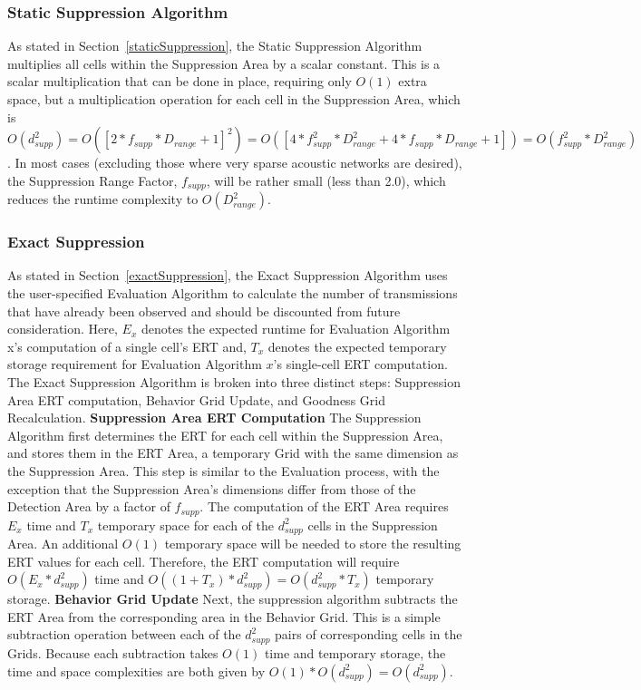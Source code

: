 \subsubsection{Static Suppression Algorithm}
As stated in Section~\ref{staticSuppression}, the Static Suppression Algorithm multiplies all cells within the Suppression Area by a scalar constant.  This is a scalar multiplication that can be done in place, requiring only $O(1)$ extra space, but a multiplication operation for each cell in the Suppression Area, which is $O(d_{supp} ^2) = O([2*f_{supp}*D_{range} + 1]^2) = O([4*f_{supp}^2*D_{range}^2 + 4*f_{supp}*D_{range} + 1]) = O(f_{supp}^2*D_{range}^2)$.  In most cases (excluding those where very sparse acoustic networks are desired), the Suppression Range Factor, $f_{supp}$, will be rather small (less than 2.0), which reduces the runtime complexity to $O(D_{range}^2)$.

\subsubsection{Exact Suppression}
As stated in Section~\ref{exactSuppression}, the Exact Suppression Algorithm uses the user-specified Evaluation Algorithm to calculate the number of transmissions that have already been observed and should be discounted from future consideration.  Here, $E_{x}$ denotes the expected runtime for Evaluation Algorithm x's computation of a single cell's ERT and, $T_{x}$ denotes the expected temporary storage requirement for Evaluation Algorithm $x$'s single-cell ERT computation.  The Exact Suppression Algorithm is broken into three distinct steps: Suppression Area ERT computation, Behavior Grid Update, and Goodness Grid Recalculation.
\newline
\newline 
\textbf{Suppression Area ERT Computation}\newline
The Suppression Algorithm first determines the ERT for each cell within the Suppression Area, and stores them in the ERT Area, a temporary Grid with the same dimension as the Suppression Area.  This step is similar to the Evaluation process, with the exception that the Suppression Area's dimensions differ from those of the Detection Area by a factor of $f_{supp}$.  The computation of the ERT Area requires $E_{x}$ time and  $T_x$ temporary space for each of the $d_{supp}^2$ cells in the Suppression Area.  An additional  $O(1)$ temporary space will be needed to store the resulting ERT values for each cell.  Therefore, the ERT computation will require $O(E_{x} * d_{supp}^2)$ time and $O((1 + T_x)* d_{supp}^2) = O(d_{supp}^2 * T_x)$ temporary storage.
\newline
\newline
\textbf{Behavior Grid Update}\newline
Next, the suppression algorithm subtracts the ERT Area from the corresponding area in the Behavior Grid.  This is a simple subtraction operation between each of the $d_{supp}^2$ pairs of corresponding cells in the Grids.  Because each subtraction takes $O(1)$ time and temporary storage, the time and space complexities are both given by $O(1) * O(d_{supp}^2) = O(d_{supp}^2)$.

